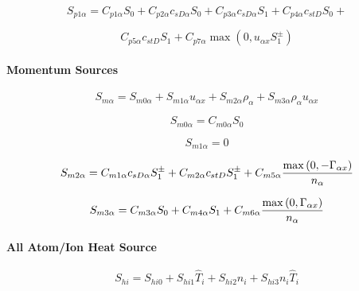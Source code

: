 \documentclass[11pt]{article}
\begin{document}
\begin{equation*}
S_{p1\alpha}=C_{p1\alpha}S_{0}+C_{p2\alpha}c_{sD\alpha}S_{0}+C_{p3\alpha
}c_{sD\alpha}S_{1}+C_{p4\alpha}c_{stD}S_{0}+ 
\end{equation*}

\begin{equation}
C_{p5\alpha}c_{stD}S_{1}+C_{p7\alpha}\max\left( 0,u_{\alpha x}S_{1}^{\pm
}\right)   \label{92}
\end{equation}

\bigskip

\paragraph{Momentum Sources}

\begin{equation}
S_{m\alpha}=S_{m0\alpha}+S_{m1\alpha}u_{\alpha x}+S_{m2\alpha}\rho_{\alpha
}+S_{m3\alpha}\rho_{\alpha}u_{\alpha x}   \label{93}
\end{equation}

\begin{equation}
S_{m0\alpha}=C_{m0\alpha}S_{0}   \label{94}
\end{equation}

\begin{equation}
S_{m1\alpha}=0   \label{95}
\end{equation}

\begin{equation}
S_{m2\alpha}=C_{m1\alpha}c_{sD\alpha}S_{1}^{\pm}+C_{m2\alpha}c_{stD}S_{1}^{%
\pm}+C_{m5\alpha}\frac{\max\left( 0,-\Gamma_{\alpha x}\right) }{n_{\alpha }} 
\label{96}
\end{equation}

\begin{equation}
S_{m3\alpha}=C_{m3\alpha}S_{0}+C_{m4\alpha}S_{1}+C_{m6\alpha}\frac{%
\max\left( 0,\Gamma_{\alpha x}\right) }{n_{\alpha}}   \label{97}
\end{equation}

\bigskip

\paragraph{All Atom/Ion Heat Source}

\begin{equation}
S_{hi}=S_{hi0}+S_{hi1}\widehat{T}_{i}+S_{hi2}n_{i}+S_{hi3}n_{i}\widehat{T}%
_{i}   \label{98}
\end{equation}
\end{document}

